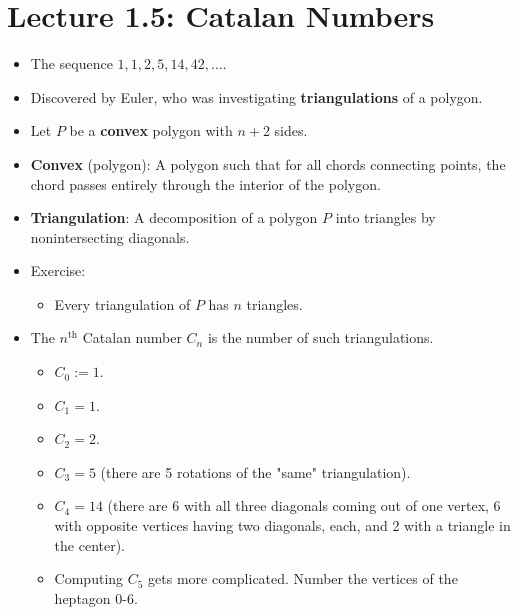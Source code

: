 \documentclass[../apprentice.tex]{subfiles}
\begin{document}
\section{Lecture 1.5: Catalan Numbers}
\begin{itemize}
    \item {}The sequence $1,1,2,5,14,42,\dots$.
    \item Discovered by Euler, who was investigating \textbf{triangulations} of a polygon.
    \item Let $P$ be a \textbf{convex} polygon with $n+2$ sides.
    \item \textbf{Convex} (polygon): A polygon such that for all chords connecting points, the chord passes entirely through the interior of the polygon.
    \item \textbf{Triangulation}: A decomposition of a polygon $P$ into triangles by nonintersecting diagonals.
    \item Exercise:
    \begin{itemize}
        \item Every triangulation of $P$ has $n$ triangles.
    \end{itemize}
    \item The $n^\text{th}$ Catalan number $C_n$ is the number of such triangulations.
    \begin{itemize}
        \item $C_0:=1$.
        \item $C_1=1$.
        \item $C_2=2$.
        \item $C_3=5$ (there are 5 rotations of the "same" triangulation).
        \item $C_4=14$ (there are 6 with all three diagonals coming out of one vertex, 6 with opposite vertices having two diagonals, each, and 2 with a triangle in the center).
        \item Computing $C_5$ gets more complicated. Number the vertices of the heptagon 0-6.
        \begin{figure}[h!]
            \centering
            \begin{subfigure}[b]{0.24\linewidth}
                \centering
\end{subfigure}
\end{figure}
\end{itemize}
\end{itemize}
\end{document}
